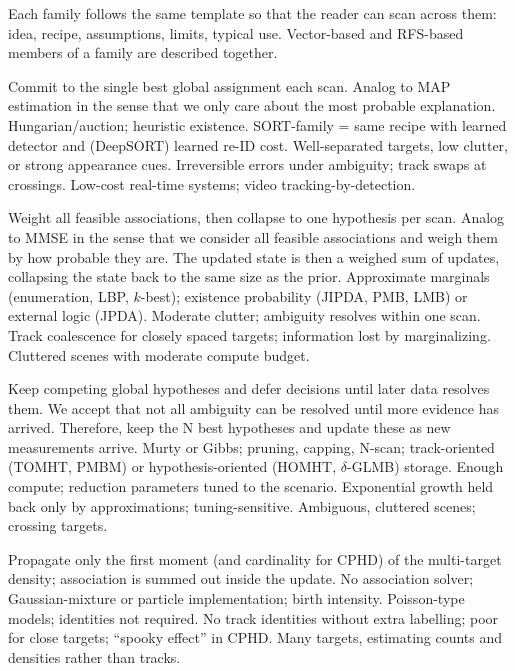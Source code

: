 Each family follows the same template so that the reader can scan across
them: idea, recipe, assumptions, limits, typical use. Vector-based and
RFS-based members of a family are described together.

 {Commit to the single best global assignment each scan. Analog to MAP estimation in the sense that we only care about the most probable explanation.} 
 {Hungarian/auction; heuristic existence. SORT-family = same recipe with learned detector and (DeepSORT) learned re-ID cost.}
 {Well-separated targets, low clutter, or strong appearance cues.}
 {Irreversible errors under ambiguity; track swaps at crossings.}
 {Low-cost real-time systems; video tracking-by-detection.}

 {Weight all feasible associations, then collapse to one hypothesis per scan. Analog to MMSE in the sense that we consider all feasible associations and weigh them by how probable they are. The updated state is then a weighed sum of updates, collapsing the state back to the same size as the prior.}
 {Approximate marginals (enumeration, LBP, $k$-best); existence probability (JIPDA, PMB, LMB) or external logic (JPDA).}
 {Moderate clutter; ambiguity resolves within one scan.}
 {Track coalescence for closely spaced targets; information lost by marginalizing.}
 {Cluttered scenes with moderate compute budget.}

 {Keep competing global hypotheses and defer decisions until later data resolves them. We accept that not all ambiguity can be resolved until more evidence has arrived. Therefore, keep the N best hypotheses and update these as new measurements arrive.}
 {Murty or Gibbs; pruning, capping, N-scan; track-oriented (TOMHT, PMBM) or hypothesis-oriented (HOMHT, $\delta$-GLMB) storage.}
 {Enough compute; reduction parameters tuned to the scenario.}
 {Exponential growth held back only by approximations; tuning-sensitive.}
 {Ambiguous, cluttered scenes; crossing targets.}

 {Propagate only the first moment (and cardinality for CPHD) of the multi-target density; association is summed out inside the update.}
 {No association solver; Gaussian-mixture or particle implementation; birth intensity.}
 {Poisson-type models; identities not required.}
 {No track identities without extra labelling; poor for close targets; ``spooky effect'' in CPHD.}
 {Many targets, estimating counts and densities rather than tracks.}

